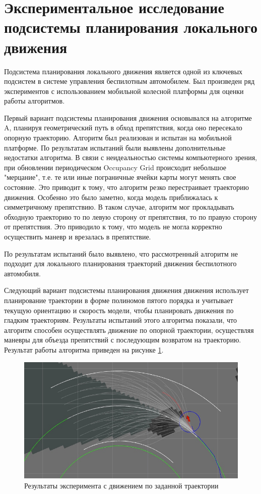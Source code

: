 \section{Экспериментальное исследование подсистемы планирования локального движения}

Подсистема планирования локального движения является одной из ключевых подсистем в системе управления беспилотным
автомобилем. Был произведен ряд экспериментов с использованием мобильной колесной платформы для оценки работы алгоритмов.

Первый вариант подсистемы планирования движения основывался на алгоритме A, планируя геометрический путь в обход
препятствия, когда оно пересекало опорную траекторию.
Алгоритм был реализован и испытан на мобильной платформе. По результатам испытаний были выявлены дополнительные
недостатки алгоритма. В связи с неидеальностью системы компьютерного зрения, при обновлении периодическом Occupancy Grid
происходит небольшое "мерцание", т.е. те или иные пограничные ячейки карты могут менять свое состояние. Это приводит
к тому, что алгоритм резко перестраивает траекторию движения. Особенно это было заметно, когда модель приближалась
к симметричному препятствию. В таком случае, алгоритм мог прокладывать обходную траекторию то по левую сторону от
препятствия, то по правую сторону от препятствия. Это приводило к тому, что модель не могла корректно осуществить
маневр и врезалась в препятствие.

По результатам испытаний было выявлено, что рассмотренный алгоритм не подходит для локального планирования траекторий
движения беспилотного автомобиля.

Следующий вариант подсистемы планирования движения движения использует планирование траектории в форме полиномов пятого
порядка и учитывает текущую ориентацию и скорость модели, чтобы планировать движения по гладким траекториям.
Результаты испытаний этого алгоритма показали, что алгоритм способен осуществлять движение по опорной траектории,
осуществляя маневры для объезда препятствий с последующим возвратом на траекторию. Результат работы алгоритма
приведен на рисунке \ref{img:obstacle_avoidance}.

\begin{figure}[h]
    \centering
    \includegraphics[width=\linewidth]{images/obstacle_avoidance}
    \caption{Результаты эксперимента с движением по заданной траектории}
    \label{img:obstacle_avoidance}
\end{figure}

